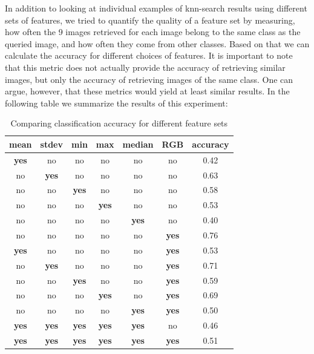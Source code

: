 In addition to looking at individual examples of knn-search results using different sets of features, we tried to quantify the quality of a feature set by measuring, how often the 9 images retrieved for each image belong to the same class as the queried image, and how often they come from other classes. Based on that we can calculate the accuracy for different choices of features. It is important to note that this metric does not actually provide the accuracy of retrieving similar images, but only the accuracy of retrieving images of the same class. One can argue, however, that these metrics would yield at least similar results. In the following table we summarize the results of this experiment:
\vspace{1em}

\begin{table}[!hbt]
\centering
	\begin{tabular}{|c|c|c|c|c|c|c|}
  \hline
  \textbf{mean} & \textbf{stdev} & \textbf{min} & \textbf{max} & \textbf{median} & \textbf{RGB} & \textbf{accuracy} \\
  \hline
  \textbf{yes} & no & no & no & no & no & 0.42 \\
  \hline
  no & \textbf{yes} & no & no & no & no & 0.63 \\
  \hline
  no & no & \textbf{yes} & no & no & no & 0.58 \\
  \hline
  no & no & no & \textbf{yes} & no & no & 0.53 \\
  \hline
  no & no & no & no & \textbf{yes} & no & 0.40 \\
  \hline
  no & no & no & no & no & \textbf{yes} & 0.76 \\
  \hline
  \textbf{yes} & no & no & no & no & \textbf{yes} & 0.53 \\
  \hline
  no & \textbf{yes} & no & no & no & \textbf{yes} & 0.71 \\
  \hline
  no & no & \textbf{yes} & no & no & \textbf{yes} & 0.59 \\
  \hline
  no & no & no & \textbf{yes} & no & \textbf{yes} & 0.69 \\
  \hline
  no & no & no & no & \textbf{yes} & \textbf{yes} & 0.50 \\
  \hline
  \textbf{yes} & \textbf{yes} & \textbf{yes} & \textbf{yes} & \textbf{yes} & no & 0.46 \\
  \hline
  \textbf{yes} & \textbf{yes} & \textbf{yes} & \textbf{yes} & \textbf{yes} & \textbf{yes} & 0.51 \\
  \hline
  \end{tabular}
  \caption{Comparing classification accuracy for different feature sets}
  \label{tab:1}
\end{table}

